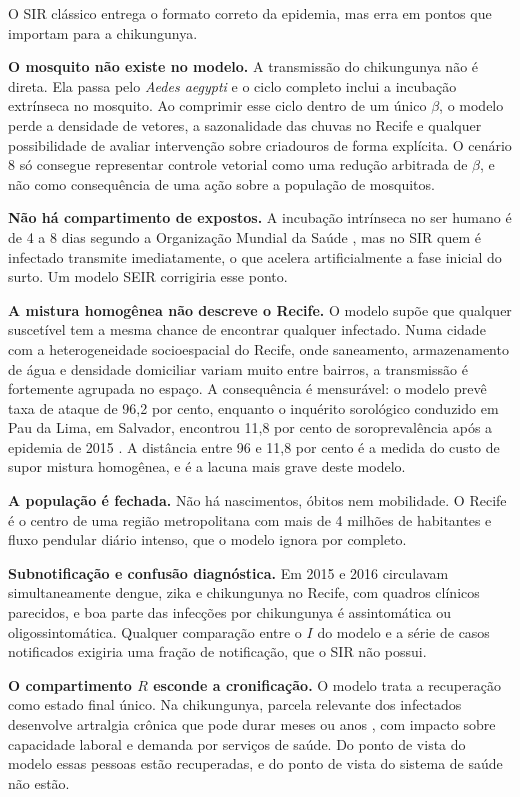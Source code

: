 \documentclass[11pt,a4paper]{article}
\begin{document}
O SIR clássico entrega o formato correto da epidemia, mas erra em pontos que importam para a chikungunya.

\textbf{O mosquito não existe no modelo.} A transmissão do chikungunya não é direta. Ela passa pelo
\textit{Aedes aegypti} e o ciclo completo inclui a incubação extrínseca no mosquito. Ao comprimir esse
ciclo dentro de um único $\beta$, o modelo perde a densidade de vetores, a sazonalidade das chuvas no
Recife e qualquer possibilidade de avaliar intervenção sobre criadouros de forma explícita. O cenário 8 só
consegue representar controle vetorial como uma redução arbitrada de $\beta$, e não como consequência de
uma ação sobre a população de mosquitos.

\textbf{Não há compartimento de expostos.} A incubação intrínseca no ser humano é de 4 a 8 dias segundo a
Organização Mundial da Saúde \cite{who}, mas no SIR quem é infectado transmite imediatamente, o que
acelera artificialmente a fase inicial do surto. Um modelo SEIR corrigiria esse ponto.

\textbf{A mistura homogênea não descreve o Recife.} O modelo supõe que qualquer suscetível tem a mesma
chance de encontrar qualquer infectado. Numa cidade com a heterogeneidade socioespacial do Recife, onde
saneamento, armazenamento de água e densidade domiciliar variam muito entre bairros, a transmissão é
fortemente agrupada no espaço. A consequência é mensurável: o modelo prevê taxa de ataque de 96,2 por
cento, enquanto o inquérito sorológico conduzido em Pau da Lima, em Salvador, encontrou 11,8 por cento de
soroprevalência após a epidemia de 2015 \cite{anjos2020}. A distância entre 96 e 11,8 por cento é a medida
do custo de supor mistura homogênea, e é a lacuna mais grave deste modelo.

\textbf{A população é fechada.} Não há nascimentos, óbitos nem mobilidade. O Recife é o centro de uma
região metropolitana com mais de 4 milhões de habitantes e fluxo pendular diário intenso, que o modelo
ignora por completo.

\textbf{Subnotificação e confusão diagnóstica.} Em 2015 e 2016 circulavam simultaneamente dengue, zika e
chikungunya no Recife, com quadros clínicos parecidos, e boa parte das infecções por chikungunya é
assintomática ou oligossintomática. Qualquer comparação entre o $I$ do modelo e a série de casos
notificados exigiria uma fração de notificação, que o SIR não possui.

\textbf{O compartimento $R$ esconde a cronificação.} O modelo trata a recuperação como estado final único.
Na chikungunya, parcela relevante dos infectados desenvolve artralgia crônica que pode durar meses ou anos
\cite{who}, com impacto sobre capacidade laboral e demanda por serviços de saúde. Do ponto de vista do
modelo essas pessoas estão recuperadas, e do ponto de vista do sistema de saúde não estão.
\end{document}
